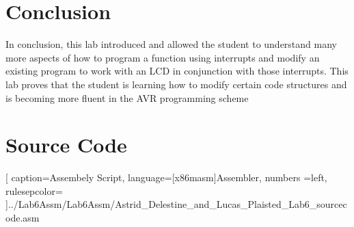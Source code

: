 \documentclass[12pt,letterpaper]{article}
\begin{document}
\section{Conclusion}
In conclusion, this lab introduced and allowed the student to understand many more aspects of how to program a function using interrupts and modify an existing program to work with an LCD in conjunction with those interrupts. This lab proves that the student is learning how to modify certain code structures and is becoming more fluent in the AVR programming scheme

\pagebreak

\section{Source Code}%

[
caption=Assembely Script,
language={[x86masm]Assembler},
numbers =left,
rulesepcolor=\color{blue}
]{../Lab6Assm/Lab6Assm/Astrid_Delestine_and_Lucas_Plaisted_Lab6_sourcecode.asm}
\end{document}
